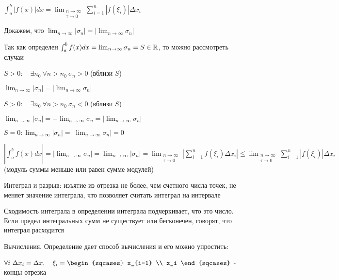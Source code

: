 \documentclass[12pt]{article}
\begin{document}
\begin{enumerate}
\begin{MyProof}
            $\int^b_a |f(x)|dx = \lim_{\substack{n\to\infty \\ \tau\to0}} \sum_{i=1}^n |f(\xi_i)| \Delta x_i$

            Докажем, что $\lim_{n\to\infty} |\sigma_n| = |\lim_{n\to\infty} \sigma_n|$

            Так как определен $\int^b_a f(x)dx = \lim_{n\to\infty} \sigma_n = S \in \mathbb{R}$, то можно рассмотреть случаи

            $S > 0: \quad \exists n_0 \ \forall n > n_0 \ \sigma_n > 0$ (вблизи $S$)

            $\lim_{n\to\infty} |\sigma_n| = |\lim_{n\to\infty} \sigma_n|$

            $S > 0: \quad \exists n_0 \ \forall n > n_0 \ \sigma_n < 0$ (вблизи $S$)

            $\lim_{n\to\infty} |\sigma_n| = -\lim_{n\to\infty} \sigma_n = |\lim_{n\to\infty} \sigma_n|$

            $S = 0: \lim_{n\to\infty} |\sigma_n| = |\lim_{n\to\infty} \sigma_n| = 0$

            $\left| \int^b_a f(x)dx \left| = |\lim_{n\to\infty} \sigma_n| = \lim_{n\to\infty} |\sigma_n| =
            \lim_{\substack{n\to\infty \\ \tau\to0}} \left|\sum_{i=1}^n f(\xi_i) \Delta x_i\right| \leq \lim_{\substack{n\to\infty \\ \tau\to0}} \sum_{i=1}^n |f(\xi_i)| \Delta x_i$ (модуль суммы меньше или равен сумме модулей)
        \end{MyProof}

    \end{enumerate}

    \Nota Интеграл и разрыв: изъятие из отрезка не более, чем счетного числа точек, не меняет значение интеграла, что позволяет считать интеграл на интервале

    \Nota Сходимость интеграла в определении интеграла подчеркивает, что это число.
    Если предел интегральных сумм не существует или бесконечен, говорят, что интеграл расходится

    \Nota Вычисления. Определение дает способ вычисления и его можно упростить:

    $\forall i\ \Delta x_i = \Delta x, \quad \xi_i = \begin{sqcases}
                                                         x_{i-1} \\ x_i
    \end{sqcases}$ - концы отрезка
\end{document}
